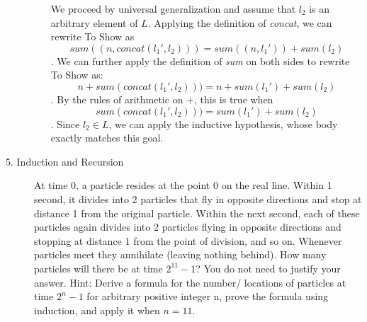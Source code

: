 \documentclass[12pt, oneside]{article}
\begin{document}
\begin{description}
\begin{enumerate}
{\begin{itemize}
We proceed by universal generalization and assume that $l_2$ is an arbitrary element of $L$. Applying the definition of \textit{concat}, we can rewrite To Show as $$\textit{sum}((n, \textit{concat}(l_1', l_2))) = \textit{sum}((n, l_1')) + \textit{sum}(l_2)$$. We can further apply the definition of \textit{sum} on both sides to rewrite To Show as: $$n + \textit{sum}(\textit{concat}(l_1', l_2))) = n + \textit{sum}(l_1') + \textit{sum}(l_2)$$. By the rules of arithmetic on $+$, this is true when $$\textit{sum}(\textit{concat}(l_1', l_2))) = \textit{sum}(l_1') + \textit{sum}(l_2)$$. Since $l_2 \in L$, we can apply the inductive hypothesis, whose body exactly matches this goal.

\end{itemize}
}
\fi

\end{enumerate}


\item[5. Induction and Recursion] 
At time 0, a particle resides at the point 0 on the real line.  
Within 1 second, it divides into 2 particles that fly in opposite directions and 
stop at distance 1 from the original particle. Within the next second, 
each of these particles again divides into 2 particles flying in opposite directions 
and stopping at distance 1 from the point of division, and so on. 
Whenever particles meet they annihilate (leaving nothing behind). 
How many particles will there be at time $2^{11} -1$? 
You do not need to justify your answer. 
Hint: Derive a formula for the number/ locations of particles at time $2^n-1$ for arbitrary 
positive integer n, prove the formula using induction, and apply it when $n=11$.

\ifsolution
{}
\end{description}
\end{document}
